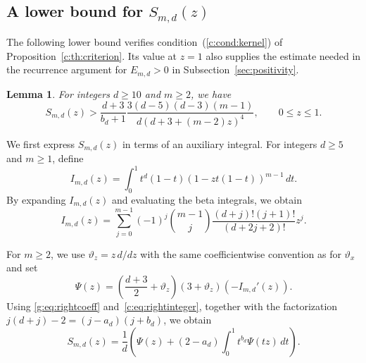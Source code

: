 \documentclass[11pt]{article}
\numberwithin{equation}{section}
\newtheorem{lemma}[theorem]{Lemma}
\theoremstyle{remark}\newtheorem{remark}[theorem]{Remark}
\newcommand{\varthetax}{\vartheta_x}
\begin{document}
\subsection{A lower bound for \texorpdfstring{$S_{m,d}(z)$}{S(z)}}\label{sec:kernel}
The following lower bound verifies condition~(\ref{c:cond:kernel}) of
Proposition~\ref{c:th:criterion}. Its value at $z=1$ also supplies the
estimate needed in the recurrence argument for $E_{m,d}>0$ in
Subsection~\ref{sec:positivity}.

\begin{lemma}\label{g:lem:kernel}
For integers $d\ge10$ and $m\ge2$, we have
\begin{equation*}
 S_{m,d}(z)>
 \frac{d+3}{b_d+1}
 \frac{3(d-5)(d-3)(m-1)}{d(d+3+(m-2)z)^4},
 \qquad 0\le z\le1.
\end{equation*}
\end{lemma}

We first express $S_{m,d}(z)$ in terms of an auxiliary integral.
For integers $d\ge5$ and $m\ge1$, define
\[
 I_{m,d}(z)=\int_0^1t^d(1-t)(1-zt(1-t))^{m-1}\,dt.
\]
By expanding $I_{m,d}(z)$ and evaluating the beta integrals, we obtain
\begin{equation}\label{g:eq:rightcoeff}
 I_{m,d}(z)=\sum_{j=0}^{m-1}(-1)^j\binom{m-1}{j}
 \frac{(d+j)!(j+1)!}{(d+2j+2)!}z^j.
\end{equation}

For $m\ge2$, we use $\vartheta_z=z\,d/dz$ with the same coefficientwise convention
as for $\varthetax$ and set
\[
 \Psi(z)=\left(\frac{d+3}{2}+\vartheta_z\right)
 (3+\vartheta_z)(-I_{m,d}'(z)).
\]
Using \eqref{g:eq:rightcoeff} and~\eqref{c:eq:rightinteger}, together with
the factorization $j(d+j)-2=(j-a_d)(j+b_d)$, we obtain
\begin{equation}\label{g:eq:Sop}
 S_{m,d}(z)=\frac1d\left(\Psi(z)
 +(2-a_d)\int_0^1t^{b_d}\Psi(tz)\,dt\right).
\end{equation}
\end{document}
